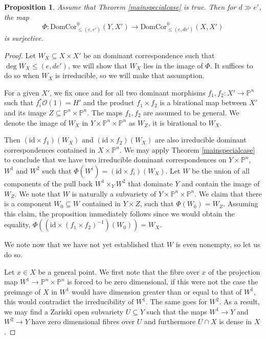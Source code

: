 \documentclass[12pt]{amsart}
\numberwithin{equation}{section}
\newtheorem{proposition}[theorem]{Proposition}
\numberwithin{theorem}{section}
\theoremstyle{definition}
\theoremstyle{definition}
\def\PP{{\mathbb{P}}}
\def\id{{\mathrm{id}}}
\def \DC{{\mathrm{DomCor}}}
\newcommand{\OO}{\mathcal{O}}
\begin{document}
\begin{proposition}
Assume that  Theorem \ref{mainspecialcase} is true.
Then for $d \gg e'$,
 the map $$\Phi: \DC^0_{\le (e,e')} (Y,X') \to \DC^0_{\le (e,de')} (X,X')$$ is surjective.
\end{proposition}

\begin{proof}
Let $W_X \subseteq X \times X'$ be an  dominant correspondence such that $\deg W_X \le (e, de')$, we will show that $W_X$ lies in the image of $\Phi$. It suffices to do so when $W_X$ is irreducible, so we will make that assumption.

 For a given $X'$, we fix once and for all two dominant morphisms $f_1, f_2: X' \to \PP^n$ such that $f_i^* \OO(1) = H'$ and  the product $f_1 \times f_2$ is a birational map between $X'$ and its image $Z \subseteq \PP^n \times \PP^n$. The maps  $f_1, f_2$ are assumed to be general. We denote the image of $W_X$ in $Y \times \PP^n \times \PP^n$ as $ W_Z$, it is birational to $W_X.$


     Then $(\id \times f_1)(W_X)$ and $(\id \times f_2)(W_X)$ are also irreducible dominant correspondences contained in $X \times \PP^n$. We may apply Theorem \ref{mainspecialcase} to conclude that  we have two irreducible dominant correspondences on $Y \times \PP^n$, $W^1$ and $W^2$ such that $\Phi(W^i) =  (\id \times f_i)(W_X)$. Let $W$ be the union of all components of the pull back  $W^1 \times _Y W^2$ that dominate $Y$ and contain the image of $W_Z$. We note that   $W$ is naturally a subvariety of $Y \times \PP^n \times \PP^n$. We claim that there is a component $W_0 \subseteq W$  contained in  $Y \times  Z$, such that  $\Phi(W_0) = W_Z$.  Assuming this claim, the proposition immediately follows since  we would obtain the equality, $\Phi((\id \times (f_1 \times f_2)^{-1}) (W_0)) = W_X$.

    We note now that we have not yet established that $W$ is  even nonempty, so let us do so. 

    Let $x \in X$ be a general point. We first note that the fibre over $x$ of the projection map $W^1 \to  \PP^n \times \PP^n $ is forced to be zero dimensional, if this were not the case the preimage of $X$ in $W^1$ would have dimension greater than or equal to that of $W^1$, this would contradict the irreducibility of $W^1$. The same goes for $W^2$. As a result, we may find  a Zariski open subvariety $U \subseteq Y$ such that the maps $W^1 \to Y$ and $W^2 \to Y$ have zero dimensional fibres over $U$ and furthermore $U \cap X$ is dense in $X$.
    

\end{proof}
\end{document}
